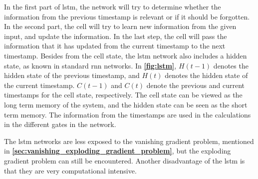 In the first part of \gls{lstm}, the network will try to determine whether the information from the previous timestamp is relevant or if it should be forgotten. In the second part, the cell will try to learn new information from the given input, and update the information. In the last step, the cell will pass the information that it has updated from the current timestamp to the next timestamp. Besides from the cell state, the \gls{lstm} network also includes a hidden state, as known in standard \gls{rnn} networks. In \textbf{\autoref{fig:lstm}}, $H(t-1)$ denotes the hidden state of the previous timestamp, and $H(t)$ denotes the hidden state of the current timestamp. $C(t-1)$ and $C(t)$ denote the previous and current timestamps for the cell state, respectively. The cell state can be viewed as the long term memory of the system, and the hidden state can be seen as the short term memory. The information from the timestamps are used in the calculations in the different gates in the network.\cite{lstmVidhya}

The \gls{lstm} networks are less exposed to the vanishing gradient problem, mentioned in \textbf{\autoref{sec:vanishing_exploding_gradient_problem}}, but the exploding gradient problem can still be encountered. Another disadvantage of the \gls{lstm} is that they are very computational intensive.\cite{Yalcın2021}